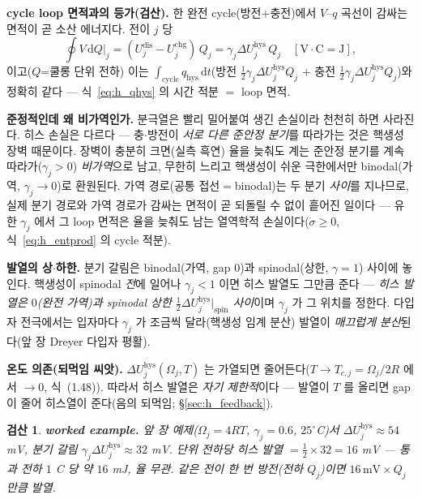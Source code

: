 \documentclass[11pt,a4paper]{article}
\newtheorem*{verifybox}{검산}
\newcommand{\dd}{\mathrm{d}}
\newcommand{\dis}{\mathrm{dis}}
\newcommand{\chg}{\mathrm{chg}}
\newcommand{\hys}{\mathrm{hys}}
\begin{document}
\textbf{cycle loop 면적과의 등가(검산).} 한 완전 cycle(방전$+$충전)에서 $V$--$q$ 곡선이 감싸는 면적이 곧 소산
에너지다. 전이 $j$ 당
\begin{equation}
\oint V\,\dd Q\Big|_j=(U_j^\dis-U_j^\chg)\,Q_j=\gamma_j\Delta U_j^\hys\,Q_j\quad[\mathrm{V\cdot C=J}],
\label{eq:h_loop}
\end{equation}
이고($Q$=쿨롱 단위 전하) 이는 $\int_\mathrm{cycle}q_\hys\,\dd t$(방전 $\tfrac12\gamma_j\Delta U_j^\hys Q_j$ $+$ 충전
$\tfrac12\gamma_j\Delta U_j^\hys Q_j$)와 정확히 같다 — 식~\eqref{eq:h_qhys} 의 시간 적분 $=$ loop 면적. \checkmark

\textbf{준정적인데 왜 비가역인가.} 분극열은 빨리 밀어붙여 생긴 손실이라 천천히 하면 사라진다. 히스 손실은 다르다 —
충$\cdot$방전이 \emph{서로 다른 준안정 분기}를 따라가는 것은 핵생성 장벽 때문이다. 장벽이 충분히 크면(실측 흑연)
율을 늦춰도 계는 준안정 분기를 계속 따라가($\gamma_j>0$) \emph{비가역}으로 남고, 무한히 느리고 핵생성이 쉬운
극한에서만 binodal(가역, $\gamma_j\to0$)로 환원된다. 가역 경로(공통 접선$=$binodal)는 두 분기 \emph{사이}를
지나므로, 실제 분기 경로와 가역 경로가 감싸는 면적이 곧 되돌릴 수 없이 흩어진 일이다 — 유한 $\gamma_j$ 에서 그
loop 면적은 율을 늦춰도 남는 열역학적 손실이다($\dot\sigma\ge0$, 식~\eqref{eq:h_entprod} 의 cycle 적분).

\textbf{발열의 상$\cdot$하한.} 분기 갈림은 binodal(가역, gap $0$)과 spinodal(상한, $\gamma=1$) 사이에 놓인다.
핵생성이 spinodal \emph{전}에 일어나 $\gamma_j<1$ 이면 히스 발열도 그만큼 준다 — \emph{히스 발열은 $0$(완전 가역)과
spinodal 상한 $\tfrac12\Delta U_j^\hys|_\mathrm{spin}$ 사이}이며 $\gamma_j$ 가 그 위치를 정한다. 다입자 전극에서는
입자마다 $\gamma_j$ 가 조금씩 달라(핵생성 임계 분산) 발열이 \emph{매끄럽게 분산}된다(앞 장 Dreyer 다입자 평활).

\textbf{온도 의존(되먹임 씨앗).} $\Delta U_j^\hys(\Omega_j,T)$ 는 가열되면 줄어든다($T\to T_{c,j}=\Omega_j/2R$ 에서
$\to0$, 식~(1.48)). 따라서 히스 발열은 \emph{자기 제한적}이다 — 발열이 $T$ 를 올리면 gap 이 줄어 히스열이 준다(음의
되먹임; \S\ref{sec:h_feedback}).
\begin{verifybox}
\textbf{worked example.} 앞 장 예제($\Omega_j=4RT$, $\gamma_j=0.6$, $25^\circ$C)서 $\Delta U_j^\hys\approx54$
mV, 분기 갈림 $\gamma_j\Delta U_j^\hys\approx32$ mV. 단위 전하당 히스 발열 $=\tfrac12\times32=16$ mV — 통과 전하
$1$ C 당 약 $16$ mJ, \emph{율 무관}. 같은 전이 한 번 방전(전하 $Q_j$)이면 $16\,\mathrm{mV}\times Q_j$ 만큼 발열.
\end{verifybox}

\end{document}

